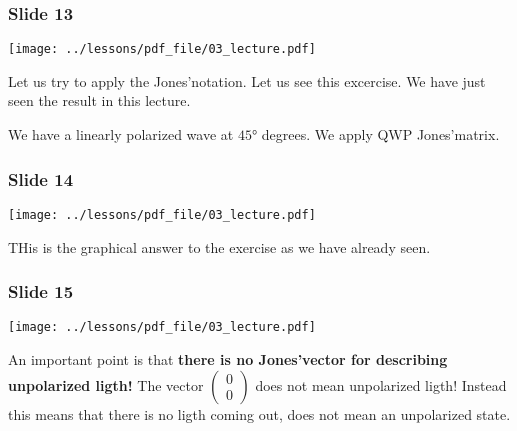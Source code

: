 \documentclass[../main/main.tex]{subfiles}
\begin{document}
\subsubsection*{Slide 13}

\begin{minipage}[]{0.5\linewidth}
\centering
\texttt{[image: ../lessons/pdf\_file/03\_lecture.pdf]}
\end{minipage}
\hspace{0.3cm}\vspace{0.3cm}
\begin{minipage}[c]{0.47\linewidth}

Let us try to apply the Jones'notation. Let us see this excercise. We have just seen the result in this lecture.

We have a linearly polarized wave at \( 45° \) degrees. We apply QWP Jones'matrix.


\end{minipage}

\subsubsection*{Slide 14}

\begin{minipage}[]{0.5\linewidth}
\centering
\texttt{[image: ../lessons/pdf\_file/03\_lecture.pdf]}
\end{minipage}
\hspace{0.3cm}\vspace{0.3cm}
\begin{minipage}[c]{0.47\linewidth}

THis is the graphical answer to the exercise as we have already seen.

\end{minipage}

\subsubsection*{Slide 15}

\begin{minipage}[]{0.5\linewidth}
\centering
\texttt{[image: ../lessons/pdf\_file/03\_lecture.pdf]}
\end{minipage}
\hspace{0.3cm}\vspace{0.3cm}
\begin{minipage}[c]{0.47\linewidth}

An important point is that \textbf{there is no Jones'vector for describing unpolarized ligth!} The vector \( \begin{pmatrix}
0 \\
0
\end{pmatrix}  \) does not mean unpolarized ligth! Instead this means that there is no ligth coming out, does not mean an unpolarized state.


\end{minipage}
\end{document}
